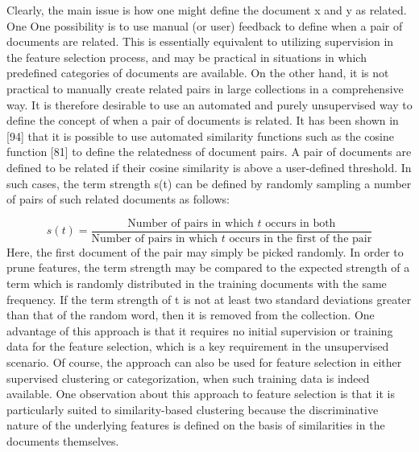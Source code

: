 Clearly, the main issue is how one might define the document x and y as related. One One possibility is to use manual (or user) feedback to define when a pair of documents are related. This is essentially equivalent to utilizing supervision in the feature selection process, and may be practical in situations in which predefined categories of documents are available. On the other hand, it is not practical to manually create related pairs in large collections in a comprehensive way. It is therefore desirable to use an automated and purely unsupervised way to define the concept of when a pair of documents is related. It has been shown in [94] that it is possible to use automated similarity functions such as the cosine function [81] to define the relatedness of document pairs. A pair of documents are defined to be related if their cosine similarity is above a user-defined threshold. In such cases, the term strength s(t) can be defined by randomly sampling a number of pairs of such related documents as follows:

\[
s(t) = \frac{\text{Number of pairs in which $t$ occurs in both}} {\text{Number of pairs in which $t$ occurs in the first of the pair}}
\label{eq:samplingpairs} \tag{234}
\]
Here, the first document of the pair may simply be picked randomly. In order to prune features, the term strength may be compared to the expected strength of a term which is randomly distributed in the training documents with the same frequency. If the term strength of t is not at least two standard deviations greater than that of the random word, then it is removed from the collection.
One advantage of this approach is that it requires no initial supervision or training data for the feature selection, which is a key requirement in the unsupervised scenario. Of course, the approach can also be used for feature selection in either supervised clustering \cite{Bobadilla2013} or categorization\cite{Salakhutdinov2007}, when such training data is indeed available. One observation about this approach to feature selection is that it is particularly suited to similarity-based clustering because the discriminative nature of the underlying features is defined on the basis of similarities in the documents themselves.

